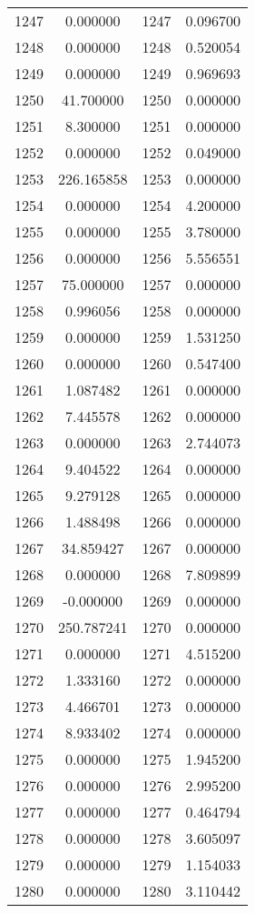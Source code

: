 \documentclass[12pt]{article}
\begin{document}
\begin{longtable}{@{}cccc@{}}
1247 & 0.000000 & 1247 & 0.096700 \\
1248 & 0.000000 & 1248 & 0.520054 \\
1249 & 0.000000 & 1249 & 0.969693 \\
1250 & 41.700000 & 1250 & 0.000000 \\
1251 & 8.300000 & 1251 & 0.000000 \\
1252 & 0.000000 & 1252 & 0.049000 \\
1253 & 226.165858 & 1253 & 0.000000 \\
1254 & 0.000000 & 1254 & 4.200000 \\
1255 & 0.000000 & 1255 & 3.780000 \\
1256 & 0.000000 & 1256 & 5.556551 \\
1257 & 75.000000 & 1257 & 0.000000 \\
1258 & 0.996056 & 1258 & 0.000000 \\
1259 & 0.000000 & 1259 & 1.531250 \\
1260 & 0.000000 & 1260 & 0.547400 \\
1261 & 1.087482 & 1261 & 0.000000 \\
1262 & 7.445578 & 1262 & 0.000000 \\
1263 & 0.000000 & 1263 & 2.744073 \\
1264 & 9.404522 & 1264 & 0.000000 \\
1265 & 9.279128 & 1265 & 0.000000 \\
1266 & 1.488498 & 1266 & 0.000000 \\
1267 & 34.859427 & 1267 & 0.000000 \\
1268 & 0.000000 & 1268 & 7.809899 \\
1269 & -0.000000 & 1269 & 0.000000 \\
1270 & 250.787241 & 1270 & 0.000000 \\
1271 & 0.000000 & 1271 & 4.515200 \\
1272 & 1.333160 & 1272 & 0.000000 \\
1273 & 4.466701 & 1273 & 0.000000 \\
1274 & 8.933402 & 1274 & 0.000000 \\
1275 & 0.000000 & 1275 & 1.945200 \\
1276 & 0.000000 & 1276 & 2.995200 \\
1277 & 0.000000 & 1277 & 0.464794 \\
1278 & 0.000000 & 1278 & 3.605097 \\
1279 & 0.000000 & 1279 & 1.154033 \\
1280 & 0.000000 & 1280 & 3.110442 \\

\end{longtable}
\end{document}
